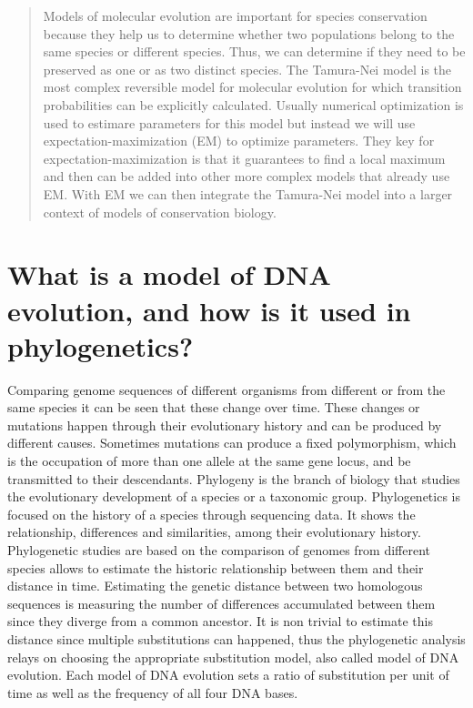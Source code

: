 \documentclass[12pt,twoside]{article}
\begin{document}
\begin{abstract}
Models of molecular evolution are important for species conservation because they help us to determine whether two populations belong to the same species or different species. Thus, we can determine if they need to be preserved as one or as two distinct species.
The Tamura-Nei model is the most complex reversible model for molecular evolution for which transition probabilities can be explicitly calculated. Usually numerical optimization is used to estimare parameters for this model but instead we will use expectation-maximization (EM) to optimize parameters. They key for expectation-maximization is that it guarantees to find a local maximum and then can be added into other more complex models that already use EM. With EM we can then integrate the Tamura-Nei model into a larger context of models of conservation biology.
\end{abstract}

\section{What is a model of DNA evolution, and how is it used in phylogenetics?}
Comparing genome sequences of different organisms from different or from the same species it can be seen that these change over time. These changes or mutations happen through their evolutionary history and can be produced by different causes. Sometimes mutations can produce a fixed polymorphism, which is the occupation of more than one allele at the same gene locus, and be transmitted to their descendants. 
Phylogeny is the branch of biology that studies the evolutionary development of a species or a taxonomic group. Phylogenetics is focused on the history of a species through sequencing data. It shows the relationship, differences and similarities, among their evolutionary history. Phylogenetic studies are based on the comparison of genomes from different species allows to estimate the historic relationship between them and their distance in time.
Estimating the genetic distance between two homologous sequences is measuring the number of differences accumulated between them since they diverge from a common ancestor. It is non trivial to estimate this distance since multiple substitutions can happened, thus the phylogenetic analysis relays on choosing the appropriate substitution model, also called model of DNA evolution. Each model of DNA evolution sets a ratio of substitution per unit of time as well as the frequency of all four DNA bases. 
\end{document}
